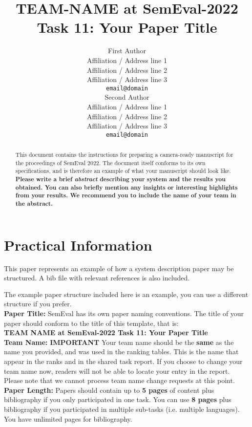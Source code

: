 \documentclass[11pt]{article}
\title{TEAM-NAME at SemEval-2022 Task 11: Your Paper Title}
\author{First Author \\
  Affiliation / Address line 1 \\
  Affiliation / Address line 2 \\
  Affiliation / Address line 3 \\
  \texttt{email@domain} \\\And
  Second Author \\
  Affiliation / Address line 1 \\
  Affiliation / Address line 2 \\
  Affiliation / Address line 3 \\
  \texttt{email@domain} \\}
\begin{document}
\maketitle
\begin{abstract}
This document contains the instructions for preparing a camera-ready manuscript for the proceedings of SemEval 2022.
%
The document itself conforms to its own specifications, and is therefore an example of what your manuscript should look like.
%
\bf Please write a brief \emph{abstract} describing your system and the results you obtained. You can also briefly mention any insights or interesting highlights from your results. We recommend you to include the name of your team in the abstract.
\end{abstract}

\section*{Practical Information}

This paper represents an example of how a system description paper may be structured.
A bib file with relevant references is also included.

The example paper structure included here is an example, you can use a different structure if you prefer.\\

{\bf Paper Title:} SemEval has its own paper naming conventions. The title of your paper should conform to the title of this template, that is:\\

{\bf TEAM NAME at SemEval-2022 Task 11: Your Paper Title} 
\\

{\bf Team Name:} {\bf IMPORTANT} Your team name should be the {\bf same} as the name you provided, and was used in the ranking tables. This is the name that appear in the ranks and in the shared task report. If you choose to change your team name now, readers will not be able to locate your entry in the report. Please note that we cannot process team name change requests at this point.
\\

{\bf Paper Length:} Papers should contain up to {\bf 5 pages} of content plus bibliography if you only participated in one task. You can use {\bf 8 pages}  plus bibliography if you participated in multiple sub-tasks (i.e. multiple languages). You have unlimited pages for bibliography.
\\
\end{document}
